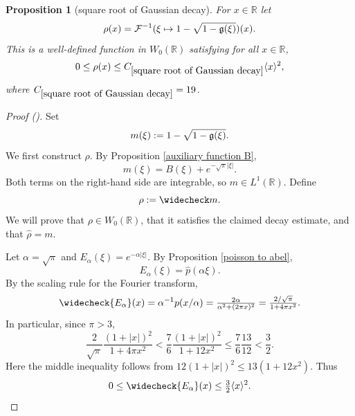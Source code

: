 \documentclass[12pt,reqno]{amsart}
\newcommand{\auto}{{({\tiny\faCar})}}
\theoremstyle{plain}
\newtheorem{proposition}[theorem]{Proposition}
\numberwithin{equation}{section}
\theoremstyle{remark}
\newcommand{\using}[1]{}
\newcommand{\R}{{\mathbb R}}
\begin{document}
\begin{proposition}[square root of Gaussian decay]\label{square root of Gaussian decay}\using{auxiliary function B}\using{poisson to abel}\using{Elementary Gaussian properties}
For $x\in\R$ let
\begin{equation}\label{auto:inverse-Fourier-square-root-Gaussian} \rho(x) = \mathcal{F}^{-1}(\xi \mapsto 1- \sqrt{1-\mathfrak{g}(\xi)})(x). \end{equation}
This is a well-defined function in $W_0(\R)$ satisfying for all $x\in\R$,
\begin{equation} \label{sqr gauss C}
    0\le \rho(x) \le C_{\ref{square root of Gaussian decay}} \langle x\rangle^2,
\end{equation}
where $C_{\ref{square root of Gaussian decay}}=19$.
\end{proposition}
\begin{proof}[Proof \auto]
Set
\[
    m(\xi):=1-\sqrt{1-\mathfrak{g}(\xi)}.
\]
We first construct \(\rho\). By Proposition \ref{auxiliary function B},
\[
    m(\xi)=B(\xi)+e^{-\sqrt{\pi}|\xi|}.
\]
Both terms on the right-hand side are integrable, so \(m\in L^1(\R)\). Define
\[
    \rho:=\widecheck m.
\]
We will prove that \(\rho\in W_0(\R)\), that it satisfies the claimed decay estimate, and that
\(\widehat\rho=m\).

Let \(\alpha=\sqrt{\pi}\) and \(E_\alpha(\xi)=e^{-\alpha|\xi|}\). By Proposition
\ref{poisson to abel},
\[
    E_\alpha(\xi)=\widehat p(\alpha \xi).
\]
By the scaling rule for the Fourier transform,
\[
    \widecheck{E_\alpha}(x)
    =
    \alpha^{-1}p(x/\alpha)
    =
    \tfrac{2\alpha}{\alpha^2+(2\pi x)^2}
    =
    \tfrac{2/\sqrt{\pi}}{1+4\pi x^2}.
\]
In particular, since $\pi>3$,
\[
\frac{2}{\sqrt\pi}\frac{(1+|x|)^2}{1+4\pi x^2}
<\frac76\frac{(1+|x|)^2}{1+12x^2}
\le\frac76\frac{13}{12}<\frac32.
\]
Here the middle inequality follows from
$12(1+|x|)^2\le13(1+12x^2)$.
Thus
\begin{equation}\label{eq:abel-decay}
    0\le \widecheck{E_\alpha}(x)\le \tfrac32\langle x\rangle^{2}.
\end{equation}


\end{proof}
\end{document}
